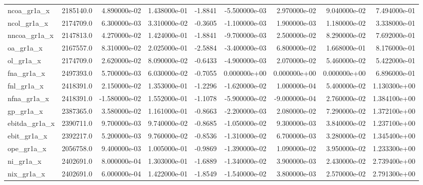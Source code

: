 \documentclass[12pt]{article}
\begin{document}
\begin{landscape}
\begin{longtable}{|l|r|r|r|r|r|r|r|r|}
ncoa\_gr1a\_x             &  2185140.0 &  4.890000e-02 &  1.438000e-01 &     -1.8841 & -5.500000e-03 &  2.970000e-02 &  9.040000e-02 &  7.494000e-01 \\
ncol\_gr1a\_x             &  2174709.0 &  6.300000e-03 &  3.310000e-02 &     -0.3605 & -1.100000e-03 &  1.900000e-03 &  1.180000e-02 &  3.338000e-01 \\
nncoa\_gr1a\_x            &  2147813.0 &  4.270000e-02 &  1.424000e-01 &     -1.8841 & -9.700000e-03 &  2.500000e-02 &  8.290000e-02 &  7.692000e-01 \\
oa\_gr1a\_x               &  2167557.0 &  8.310000e-02 &  2.025000e-01 &     -2.5884 & -3.400000e-03 &  6.800000e-02 &  1.668000e-01 &  8.176000e-01 \\
ol\_gr1a\_x               &  2174709.0 &  2.620000e-02 &  8.090000e-02 &     -0.6433 & -4.900000e-03 &  2.070000e-02 &  5.460000e-02 &  5.422000e-01 \\
fna\_gr1a\_x              &  2497393.0 &  5.700000e-03 &  6.030000e-02 &     -0.7055 &  0.000000e+00 &  0.000000e+00 &  0.000000e+00 &  6.896000e-01 \\
fnl\_gr1a\_x              &  2418391.0 &  2.150000e-02 &  1.353000e-01 &     -1.2296 & -1.620000e-02 &  1.000000e-04 &  5.400000e-02 &  1.130300e+00 \\
nfna\_gr1a\_x             &  2418391.0 & -1.580000e-02 &  1.552000e-01 &     -1.1078 & -5.900000e-02 & -9.000000e-04 &  2.760000e-02 &  1.384100e+00 \\
gp\_gr1a\_x               &  2387365.0 &  3.580000e-02 &  1.161000e-01 &     -0.8663 & -2.200000e-03 &  2.080000e-02 &  7.290000e-02 &  1.372100e+00 \\
ebitda\_gr1a\_x           &  2390711.0 &  9.700000e-03 &  9.740000e-02 &     -0.8685 & -1.050000e-02 &  9.300000e-03 &  3.840000e-02 &  1.237100e+00 \\
ebit\_gr1a\_x             &  2392217.0 &  5.200000e-03 &  9.760000e-02 &     -0.8536 & -1.310000e-02 &  6.700000e-03 &  3.280000e-02 &  1.345400e+00 \\
ope\_gr1a\_x              &  2056758.0 &  9.400000e-03 &  1.005000e-01 &     -0.9869 & -1.390000e-02 &  1.090000e-02 &  3.950000e-02 &  1.233300e+00 \\
ni\_gr1a\_x               &  2402691.0 &  8.000000e-04 &  1.303000e-01 &     -1.6889 & -1.340000e-02 &  3.900000e-03 &  2.430000e-02 &  2.739400e+00 \\
nix\_gr1a\_x              &  2402691.0 &  6.000000e-04 &  1.422000e-01 &     -1.8549 & -1.540000e-02 &  3.800000e-03 &  2.570000e-02 &  2.791300e+00 \\

\end{longtable}
\end{landscape}
\end{document}
